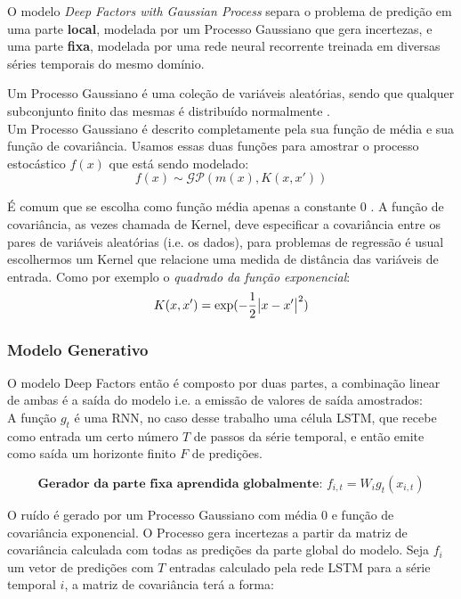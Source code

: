 O modelo \textit{Deep Factors with Gaussian Process} \citep{deepfactors} separa o problema de predição em uma parte \textbf{local}, modelada por um Processo Gaussiano que gera incertezas, e uma parte \textbf{fixa}, modelada por uma rede neural recorrente treinada em diversas séries temporais do mesmo domínio.


Um Processo Gaussiano é uma coleção de variáveis aleatórias,
sendo que qualquer subconjunto finito das mesmas é distribuído normalmente \citep{gpml}. \\

Um Processo Gaussiano é descrito completamente pela sua função de média e sua função de covariância. Usamos essas duas funções para amostrar o processo estocástico $f(x)$ que está sendo modelado: \\

\[
f(x) \sim \mathcal{GP}( m(x), K(x,x'))
\]

É comum que se escolha como função média apenas a constante 0 \citep{gpml}.  A função de covariância, as vezes chamada de Kernel, deve especificar a covariância entre os pares de variáveis aleatórias (i.e. os dados), para problemas de regressão é usual escolhermos um Kernel que relacione uma medida de distância das variáveis de entrada. Como por exemplo o \textit{quadrado da função exponencial}: \\

\[
  K(x,x') = \exp(-\frac{1}{2}\abs{x - x'}^2)
\]


\subsubsection{Modelo Generativo}

O modelo Deep Factors então é composto por duas partes, a combinação linear de ambas é a saída do modelo i.e. a emissão de valores de saída amostrados: \\


A função $g_t$ é uma RNN, no caso desse trabalho uma célula LSTM, que recebe como entrada um certo número $T$ de passos da série temporal, e então emite como saída um horizonte finito $F$ de predições.

\[
  \textbf{Gerador da parte fixa aprendida globalmente: }  f_{i,t} = W_ig_t(x_{i,t})
\]

O ruído é gerado por um Processo Gaussiano com média 0 e função de covariância
exponencial. O Processo gera incertezas a partir da matriz de covariância
calculada com todas as predições da parte global do modelo. Seja $f_i$ um vetor
de predições com $T$ entradas calculado pela rede LSTM para a série temporal $i$, a matriz de covariância
terá a forma:  

